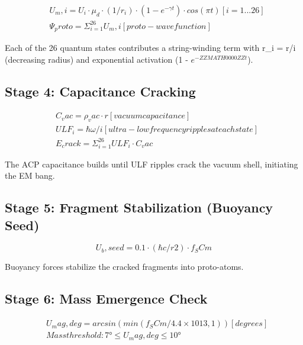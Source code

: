 \documentclass[12pt,a4paper]{article}
\begin{document}
\begin{equation}
\begin{aligned}
  & U_m,i = U_i \cdot \mu_d \cdot (1/r_i) \cdot (1 - e^{-\gamma t}) \cdot cos(\pi t)     [i = 1...26] \\
  & \Psi_proto = \Sigma_{i=1}^{26} U_m,i                                 [proto-wavefunction]
\end{aligned}
\end{equation}

Each of the 26 quantum states contributes a string-winding term with r\_i = r/i (decreasing radius) and exponential activation (1 - $e^{-ZZMATH0000ZZt}$).

\subsection{Stage 4: Capacitance Cracking}

\begin{equation}
\begin{aligned}
  & C_vac = \rho_vac \cdot r                [vacuum capacitance] \\
  & ULF_i = \hbar\omega/i                    [ultra-low frequency ripples at each state] \\
  & E_crack = \Sigma_{i=1}^{26} ULF_i \cdot C_vac
\end{aligned}
\end{equation}

The ACP capacitance builds until ULF ripples crack the vacuum shell, initiating the EM bang.

\subsection{Stage 5: Fragment Stabilization (Buoyancy Seed)}

\begin{equation}
U_b,seed = 0.1 \cdot (\hbar c/r2) \cdot f_SCm
\end{equation}

Buoyancy forces stabilize the cracked fragments into proto-atoms.

\subsection{Stage 6: Mass Emergence Check}

\begin{equation}
\begin{aligned}
  & U_mag,deg = arcsin(min(f_SCm / 4.4\times1013, 1))     [degrees] \\
  & Mass threshold: 7° \leq U_mag,deg \leq 10°
\end{aligned}
\end{equation}
\end{document}
